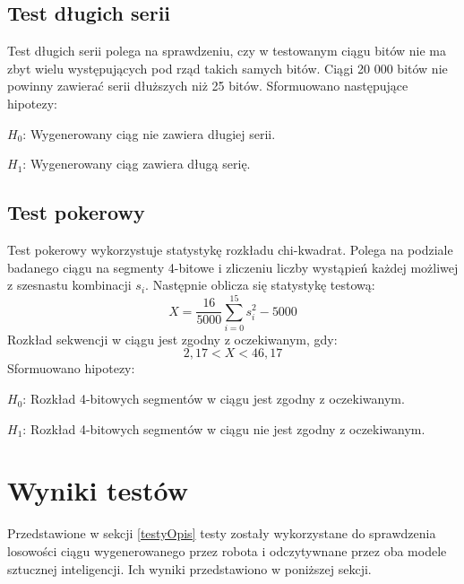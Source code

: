 \subsection{Test długich serii}
Test długich serii polega na sprawdzeniu, czy w testowanym ciągu bitów nie ma zbyt wielu występujących pod rząd takich 
samych bitów. Ciągi 20 000 bitów nie powinny zawierać serii dłuższych niż 25 bitów. Sformuowano następujące hipotezy:
\par \begin{math} H_0 \end{math}: Wygenerowany ciąg nie zawiera długiej serii.
\par \begin{math} H_1 \end{math}: Wygenerowany ciąg zawiera długą serię.

\subsection{Test pokerowy}
\label{pokerowyOpis}
Test pokerowy wykorzystuje statystykę rozkładu chi-kwadrat. Polega na podziale badanego ciągu na segmenty 4-bitowe i 
zliczeniu liczby wystąpień każdej możliwej z szesnastu kombinacji \begin{math}s_i\end{math}. Następnie oblicza się 
statystykę testową:
\begin{displaymath}
    X = \frac{16}{5000} \sum^{15}_{i=0} s_i^2 - 5000
\end{displaymath}
Rozkład sekwencji w ciągu jest zgodny z oczekiwanym, gdy:
\begin{displaymath}
    2{,}17 < X < 46{,}17
\end{displaymath}
Sformuowano hipotezy:
\par \begin{math} H_0 \end{math}: Rozkład 4-bitowych segmentów w ciągu jest zgodny z oczekiwanym.
\par \begin{math} H_1 \end{math}: Rozkład 4-bitowych segmentów w ciągu nie jest zgodny z oczekiwanym.

\section{Wyniki testów}
Przedstawione w sekcji \ref{testyOpis} testy zostały wykorzystane do sprawdzenia losowości ciągu wygenerowanego przez robota i 
odczytywnane przez oba modele sztucznej inteligencji. Ich wyniki przedstawiono w poniższej sekcji.

